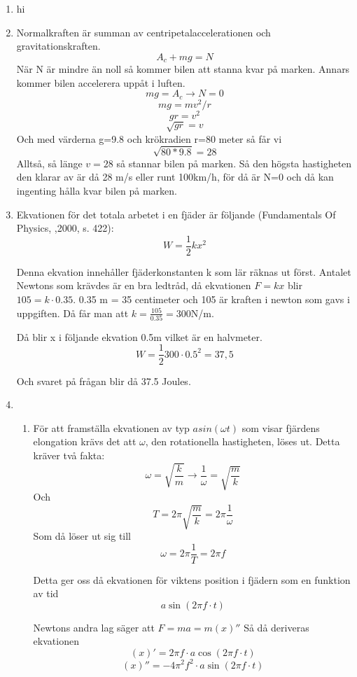 \documentclass[a4paper,12pt]{article}
\begin{document}
\begin{enumerate}
    \item hi

    \item Normalkraften är summan av centripetalaccelerationen och gravitationskraften.
          $$A_c+mg=N$$
          När N är mindre än noll så kommer bilen att stanna kvar på marken. Annars
          kommer bilen accelerera uppåt i luften.
          $$mg=A_c\rightarrow N=0$$
          $$mg=mv^2/r$$
          $$gr=v^2$$
          $$\sqrt{gr}=v$$
          Och med värderna g=9.8 och krökradien r=80 meter så får vi
          $$\sqrt{80*9.8}=28$$
          Alltså, så länge $v=28$ så stannar bilen på marken. Så den högsta
          hastigheten den klarar av är då 28 m/s eller runt 100km/h, för då är N=0
          och då kan ingenting hålla kvar bilen på marken.

    \item Ekvationen för det totala arbetet i en fjäder är följande (Fundamentals Of Physics, ,2000, s. 422):
    $$W=\frac{1}{2}kx^2$$
    
    Denna ekvation innehåller fjäderkonstanten k som lär räknas ut först.
    Antalet Newtons som krävdes är en bra ledtråd, då ekvationen $F=kx$ 
    blir $105=k\cdot 0.35$. 0.35 m = 35 centimeter och 105 är kraften i newton som 
    gavs i uppgiften. Då får man att $k=\frac{105}{0.35}=300$N/m.

    Då blir x i följande ekvation 0.5m vilket är en halvmeter. 
    $$W=\frac{1}{2}300\cdot 0.5^2=37,5$$

    Och svaret på frågan blir då 37.5 Joules.

    \item 
    \begin{enumerate}
        \item För att framställa ekvationen av typ $asin(\omega t)$ som visar fjärdens 
        elongation krävs det att $\omega$, 
        den rotationella hastigheten, löses ut. Detta kräver två fakta:
        $$\omega=\sqrt{\frac{k}{m}}\rightarrow\frac{1}{\omega}=\sqrt{\frac{m}{k}}$$
        Och
        $$T=2\pi\sqrt{\frac{m}{k}}=2\pi\frac{1}{\omega}$$
        Som då löser ut sig till
        $$\omega=2\pi\frac{1}{T}=2\pi f$$
        
        Detta ger oss då ekvationen för viktens position i fjädern som
        en funktion av tid
        $$a\sin(2\pi f\cdot t)$$
 
        Newtons andra lag säger att $F=ma=m(x)''$
        Så då deriveras ekvationen
        $$(x)'=2\pi f\cdot a\cos(2\pi f\cdot t)$$
        $$(x)''=-4\pi^2 f^2\cdot a\sin(2\pi f\cdot t)$$


\end{enumerate}
\end{enumerate}
\end{document}
